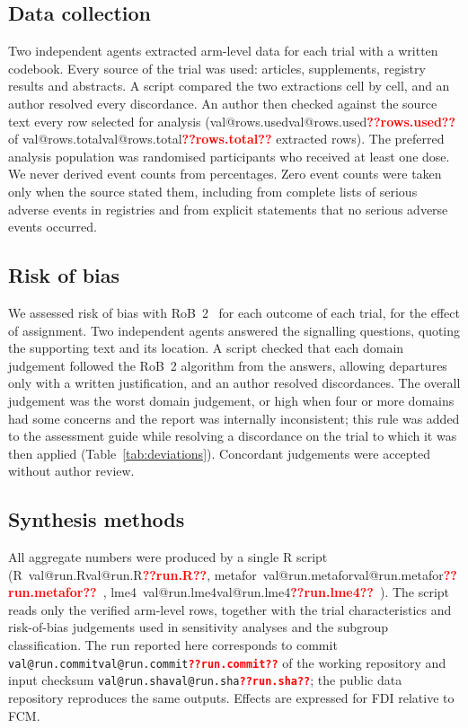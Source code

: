 \documentclass[11pt,a4paper]{article}
\makeatletter
\newcommand{\val}[1]{\ifcsname val@#1\endcsname\csname val@#1\endcsname\else\textbf{\textcolor{red}{??#1??}}\fi}
\makeatother
\begin{document}
\subsection{Data collection}
Two independent agents extracted arm-level data for each trial with a written codebook. Every source of the trial was used: articles, supplements, registry results and abstracts. A script compared the two extractions cell by cell, and an author resolved every discordance. An author then checked against the source text every row selected for analysis (\val{rows.used} of \val{rows.total} extracted rows). The preferred analysis population was randomised participants who received at least one dose. We never derived event counts from percentages. Zero event counts were taken only when the source stated them, including from complete lists of serious adverse events in registries and from explicit statements that no serious adverse events occurred.

\subsection{Risk of bias}
We assessed risk of bias with RoB~2~\cite{Sterne2019} for each outcome of each trial, for the effect of assignment. Two independent agents answered the signalling questions, quoting the supporting text and its location. A script checked that each domain judgement followed the RoB~2 algorithm from the answers, allowing departures only with a written justification, and an author resolved discordances. The overall judgement was the worst domain judgement, or high when four or more domains had some concerns and the report was internally inconsistent; this rule was added to the assessment guide while resolving a discordance on the trial to which it was then applied (Table~\ref{tab:deviations}). Concordant judgements were accepted without author review.

\subsection{Synthesis methods}
All aggregate numbers were produced by a single R script (R~\val{run.R}, metafor~\val{run.metafor}~\cite{Viechtbauer2010}, lme4~\val{run.lme4}~\cite{Bates2015}). The script reads only the verified arm-level rows, together with the trial characteristics and risk-of-bias judgements used in sensitivity analyses and the subgroup classification. The run reported here corresponds to commit \texttt{\val{run.commit}} of the working repository and input checksum \texttt{\val{run.sha}}; the public data repository reproduces the same outputs. Effects are expressed for FDI relative to FCM.
\end{document}

